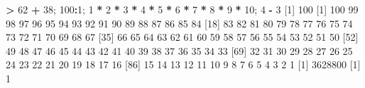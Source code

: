 \documentclass[]{book}
\newenvironment{Shaded}{\begin{snugshade}}{\end{snugshade}}
\newcommand{\DecValTok}[1]{\textcolor[rgb]{0.00,0.00,0.81}{#1}}
\newcommand{\StringTok}[1]{\textcolor[rgb]{0.31,0.60,0.02}{#1}}
\newcommand{\OperatorTok}[1]{\textcolor[rgb]{0.81,0.36,0.00}{\textbf{#1}}}
\newcommand{\NormalTok}[1]{#1}
\begin{document}
\begin{Shaded}
\begin{Highlighting}[]
\OperatorTok{>}\StringTok{ }\DecValTok{62} \OperatorTok{+}\StringTok{ }\DecValTok{38}\NormalTok{; }\DecValTok{100}\OperatorTok{:}\DecValTok{1}\NormalTok{; }\DecValTok{1} \OperatorTok{*}\StringTok{ }\DecValTok{2} \OperatorTok{*}\StringTok{ }\DecValTok{3} \OperatorTok{*}\StringTok{ }\DecValTok{4} \OperatorTok{*}\StringTok{ }\DecValTok{5} \OperatorTok{*}\StringTok{ }\DecValTok{6} \OperatorTok{*}\StringTok{ }\DecValTok{7} \OperatorTok{*}\StringTok{ }\DecValTok{8} \OperatorTok{*}\StringTok{ }\DecValTok{9} \OperatorTok{*}\StringTok{ }\DecValTok{10}\NormalTok{; }\DecValTok{4} \OperatorTok{-}\StringTok{ }\DecValTok{3}
\NormalTok{[}\DecValTok{1}\NormalTok{] }\DecValTok{100}
\NormalTok{  [}\DecValTok{1}\NormalTok{] }\DecValTok{100}  \DecValTok{99}  \DecValTok{98}  \DecValTok{97}  \DecValTok{96}  \DecValTok{95}  \DecValTok{94}  \DecValTok{93}  \DecValTok{92}  \DecValTok{91}  \DecValTok{90}  \DecValTok{89}  \DecValTok{88}  \DecValTok{87}  \DecValTok{86}  \DecValTok{85}  \DecValTok{84}
\NormalTok{ [}\DecValTok{18}\NormalTok{]  }\DecValTok{83}  \DecValTok{82}  \DecValTok{81}  \DecValTok{80}  \DecValTok{79}  \DecValTok{78}  \DecValTok{77}  \DecValTok{76}  \DecValTok{75}  \DecValTok{74}  \DecValTok{73}  \DecValTok{72}  \DecValTok{71}  \DecValTok{70}  \DecValTok{69}  \DecValTok{68}  \DecValTok{67}
\NormalTok{ [}\DecValTok{35}\NormalTok{]  }\DecValTok{66}  \DecValTok{65}  \DecValTok{64}  \DecValTok{63}  \DecValTok{62}  \DecValTok{61}  \DecValTok{60}  \DecValTok{59}  \DecValTok{58}  \DecValTok{57}  \DecValTok{56}  \DecValTok{55}  \DecValTok{54}  \DecValTok{53}  \DecValTok{52}  \DecValTok{51}  \DecValTok{50}
\NormalTok{ [}\DecValTok{52}\NormalTok{]  }\DecValTok{49}  \DecValTok{48}  \DecValTok{47}  \DecValTok{46}  \DecValTok{45}  \DecValTok{44}  \DecValTok{43}  \DecValTok{42}  \DecValTok{41}  \DecValTok{40}  \DecValTok{39}  \DecValTok{38}  \DecValTok{37}  \DecValTok{36}  \DecValTok{35}  \DecValTok{34}  \DecValTok{33}
\NormalTok{ [}\DecValTok{69}\NormalTok{]  }\DecValTok{32}  \DecValTok{31}  \DecValTok{30}  \DecValTok{29}  \DecValTok{28}  \DecValTok{27}  \DecValTok{26}  \DecValTok{25}  \DecValTok{24}  \DecValTok{23}  \DecValTok{22}  \DecValTok{21}  \DecValTok{20}  \DecValTok{19}  \DecValTok{18}  \DecValTok{17}  \DecValTok{16}
\NormalTok{ [}\DecValTok{86}\NormalTok{]  }\DecValTok{15}  \DecValTok{14}  \DecValTok{13}  \DecValTok{12}  \DecValTok{11}  \DecValTok{10}   \DecValTok{9}   \DecValTok{8}   \DecValTok{7}   \DecValTok{6}   \DecValTok{5}   \DecValTok{4}   \DecValTok{3}   \DecValTok{2}   \DecValTok{1}
\NormalTok{[}\DecValTok{1}\NormalTok{] }\DecValTok{3628800}
\NormalTok{[}\DecValTok{1}\NormalTok{] }\DecValTok{1}
\end{Highlighting}
\end{Shaded}
\end{document}

